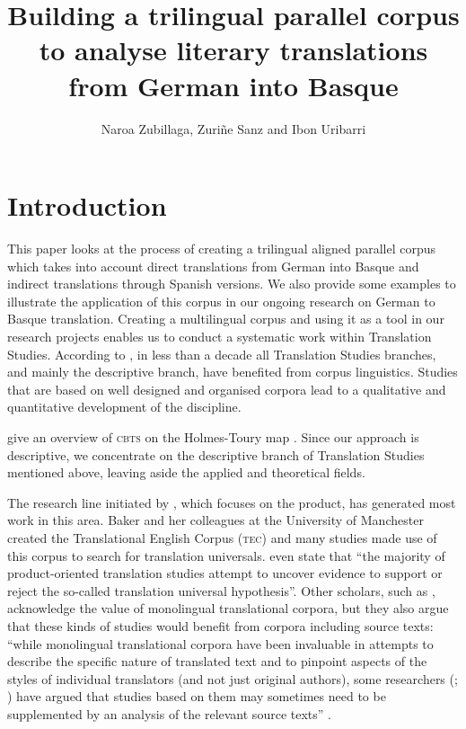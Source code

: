 \documentclass[output=paper]{LSP/langsci}
\author{Naroa Zubillaga, Zuriñe Sanz and Ibon Uribarri}
\title{Building a trilingual parallel corpus to analyse literary translations from {German into Basque}}
\begin{document}
\section{Introduction} \label{sec:3:1}
  
This paper looks at the process of creating a trilingual aligned parallel corpus which takes into account direct translations from German into Basque and indirect translations through Spanish versions. We also provide some examples to illustrate the application of this corpus in our ongoing research on German to Basque translation. Creating a multilingual corpus and using it as a tool in our research projects enables us to conduct a systematic work within Translation Studies. According to \citet[216]{Corpas2008}, in less than a decade all Translation Studies branches, and mainly the descriptive branch, have benefited from corpus linguistics. Studies that are based on well designed and organised corpora lead to a qualitative and quantitative development of the discipline.

\citet{Xiao2009} give an overview of \textsc{cbts} on the Holmes-Toury map \citep[243]{Xiao2009}. Since our approach is descriptive, we concentrate on the descriptive branch of Translation Studies mentioned above, leaving aside the applied and theoretical fields.

The research line initiated by \citet{Baker1993}, which focuses on the product, has generated most work in this area. Baker and her colleagues at the University of Manchester created the Translational English Corpus (\textsc{tec}) and many studies \citep[e.g.][]{Lavios1998b,Olohan2000,Olohan2003} made use of this corpus to search for translation universals. \citet[244]{Xiao2009} even state that “the majority of product-oriented translation studies attempt to uncover evidence to support or reject the so-called translation universal hypothesis”. Other scholars, such as \citet{Kenny2001}, acknowledge the value of monolingual translational corpora, but they also argue that these kinds of studies would benefit from corpora including source texts: “while monolingual translational corpora have been invaluable in attempts to describe the specific nature of translated text and to pinpoint aspects of the styles of individual translators (and not just original authors), some researchers (\citealt[565]{Lavios1998b}; \citealt[565]{Puurtinen1998}) have argued that studies based on them may sometimes need to be supplemented by an analysis of the relevant source texts” \citep[62]{Kenny2001}.
\end{document}
